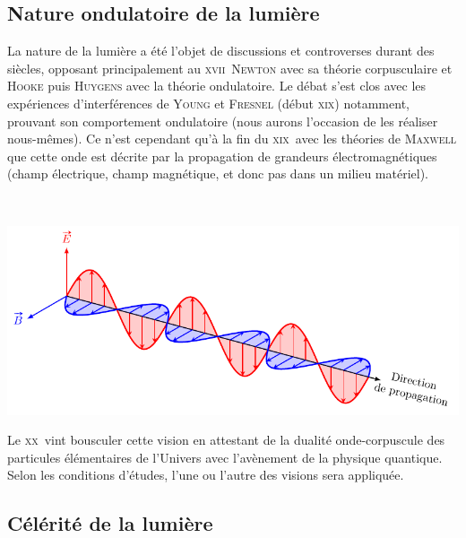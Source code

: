 \documentclass[../../main/main.tex]{subfiles}
\begin{document}
\subsection{Nature ondulatoire de la lumière}

\noindent
\begin{minipage}[t]{.48\linewidth}
	La nature de la lumière a été l'objet de discussions et controverses durant
	des siècles, opposant principalement au \textsc{xvii}\ieme\ \textsc{Newton}
	avec sa théorie corpusculaire et \textsc{Hooke} puis \textsc{Huygens} avec la
	théorie ondulatoire. Le débat s'est clos avec les expériences d'interférences
	de \textsc{Young} et \textsc{Fresnel} (début \textsc{xix}\ieme) notamment,
	prouvant son comportement ondulatoire (nous aurons l'occasion de les réaliser
	nous-mêmes).
	\smallbreak
	Ce n'est cependant qu'à la fin du \textsc{xix}\ieme\ avec les théories
	de \textsc{Maxwell} que cette onde est décrite par la propagation de grandeurs
	électromagnétiques (champ électrique, champ magnétique, et donc pas dans un
	milieu matériel).
\end{minipage}
\hfill
\begin{minipage}[t]{.48\linewidth}
	~
	\vspace*{-20pt}
	\begin{center}
		\includegraphics[width=\linewidth]{propagation}
		\label{fig:proplum}
	\end{center}
\end{minipage}
\bigbreak
Le \textsc{xx}\ieme\ vint bousculer cette vision en attestant de la dualité
onde-corpuscule des particules élémentaires de l'Univers avec l'avènement de la
physique quantique. Selon les conditions d'études, l'une ou l'autre des visions
sera appliquée.

\subsection{Célérité de la lumière}
\end{document}
